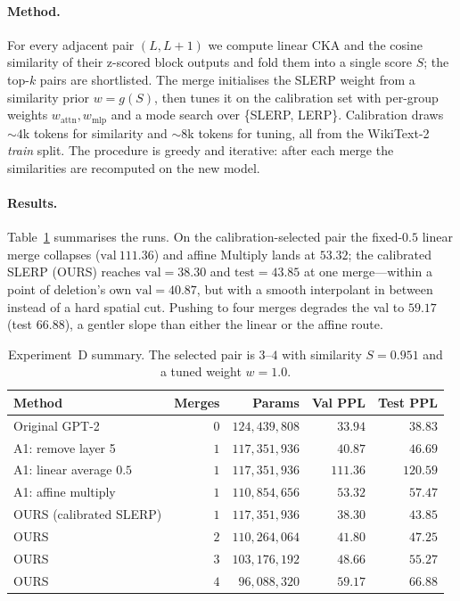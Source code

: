 \documentclass[10pt,a4paper]{article}
\begin{document}
\paragraph{Method.} For every adjacent pair $(L,L{+}1)$ we compute linear CKA
and the cosine similarity of their z-scored block outputs and fold them into a
single score $S$; the top-$k$ pairs are shortlisted. The merge initialises the
SLERP weight from a similarity prior $w=g(S)$, then tunes it on the calibration
set with per-group weights $w_\text{attn}, w_\text{mlp}$ and a mode search over
\{SLERP, LERP\}. Calibration draws ${\sim}4$k tokens for similarity and
${\sim}8$k tokens for tuning, all from the WikiText-2 \emph{train} split. The
procedure is greedy and iterative: after each merge the similarities are
recomputed on the new model.

\paragraph{Results.} Table~\ref{tab:sravan} summarises the runs. On the
calibration-selected pair the fixed-$0.5$ linear merge collapses
($\mathrm{val}\ 111.36$) and affine Multiply lands at $53.32$; the calibrated
SLERP (OURS) reaches $\mathrm{val}=38.30$ and $\mathrm{test}=43.85$ at one
merge---within a point of deletion's own $\mathrm{val}=40.87$, but with a smooth
interpolant in between instead of a hard spatial cut. Pushing to four merges
degrades the val to $59.17$ (test $66.88$), a gentler slope than either the
linear or the affine route.

\begin{table}[t]
\centering
\small
\begin{tabular}{lrrrr}
\toprule
Method & Merges & Params & Val PPL & Test PPL \\
\midrule
Original GPT-2 & $0$ & $124{,}439{,}808$ & $33.94$ & $38.83$ \\
A1: remove layer 5 & $1$ & $117{,}351{,}936$ & $40.87$ & $46.69$ \\
A1: linear average $0.5$ & $1$ & $117{,}351{,}936$ & $111.36$ & $120.59$ \\
A1: affine multiply & $1$ & $110{,}854{,}656$ & $53.32$ & $57.47$ \\
OURS (calibrated SLERP) & $1$ & $117{,}351{,}936$ & $\mathbf{38.30}$ & $\mathbf{43.85}$ \\
OURS & $2$ & $110{,}264{,}064$ & $41.80$ & $47.25$ \\
OURS & $3$ & $103{,}176{,}192$ & $48.66$ & $55.27$ \\
OURS & $4$ & $96{,}088{,}320$ & $59.17$ & $66.88$ \\
\bottomrule
\end{tabular}
\caption{Experiment~D summary. The selected pair is $3$--$4$ with similarity
$S=0.951$ and a tuned weight $w=1.0$.}
\label{tab:sravan}
\end{table}
\end{document}
